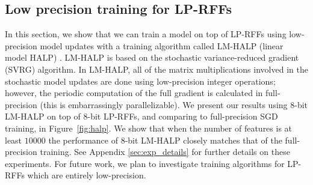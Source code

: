 
\subsection{Low precision training for LP-RFFs}
\label{sec:halp}
In this section, we show that we can train a model on top of LP-RFFs using low-precision model updates with a training algorithm called LM-HALP (linear model HALP) \citep{halp18}. LM-HALP is based on the stochastic variance-reduced gradient (SVRG) algorithm. In LM-HALP, all of the matrix multiplications involved in the stochastic model updates are done using low-precision integer operations; however, the periodic computation of the full gradient is calculated in full-precision (this is embarrassingly parallelizable). We present our results using 8-bit LM-HALP on top of 8-bit LP-RFFs, and comparing to full-precision SGD training, in Figure~\ref{fig:halp}. We show that when the number of features is at least $\num[group-separator={,}]{10000}$ the performance of 8-bit LM-HALP closely matches that of the full-precision training.  See Appendix \ref{sec:exp_details} for further details on these experiments. For future work, we plan to investigate training algorithms for LP-RFFs which are entirely low-precision.


